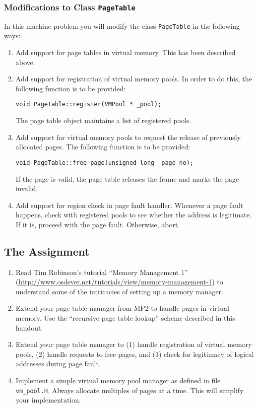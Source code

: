 \documentclass[letterpaper,11pt]{article}
\begin{document}
{\subsubsection*{Modifications to Class {\tt PageTable}}

In this machine problem you will modify the class {\tt PageTable} in the
following ways:
\begin{enumerate}
\item Add support for page tables in virtual memory. This has been
  described above.
\item Add support for registration of virtual memory pools. In
  order to do this, the following function is to be provided:
  \begin{center}
  {\tt void PageTable::register(VMPool * \_pool);}
  \end{center}
  The page table object maintains a list of registered pools.
\item Add support for virtual memory pools to request the release of
  previously allocated pages. The following function is to be
  provided:
  \begin{center}
  {\tt void PageTable::free\_page(unsigned long \_page\_no);}
  \end{center}
  If the page is valid, the page table releases the frame and marks
  the page invalid.
\item Add support for region check in page fault handler. Whenever a
  page fault happens, check with registered pools to see whether the
  address is legitimate. If it is, proceed with the page
  fault. Otherwise, abort.
\end{enumerate}

\subsection*{The Assignment}

\begin{enumerate}
\item Read  Tim Robinson's tutorial ``Memory
  Management 1''
  (\url{http://www.osdever.net/tutorials/view/memory-management-1}) to
  understand some of the intricacies of setting up a memory manager.
\item Extend your page table manager from MP2 to handle pages in
  virtual memory. Use the ``recursive page table lookup'' scheme
  described in this handout.
\item Extend your page table manager to (1) handle registration of virtual
  memory pools, (2) handle requests to free pages, and (3) check for
  legitimacy of logical addresses during page fault.
\item Implement a simple virtual memory pool manager as defined in
  file {\tt vm\_pool.H}. Always allocate multiples of pages at a
  time. This will simplify your implementation.
\end{enumerate}

}
\end{document}
